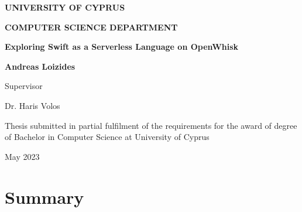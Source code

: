 \documentclass[12pt]{report}
\def\ptitle{Exploring Swift as a Serverless Language on OpenWhisk}
\begin{document}
\begin{titlepage}

\begin{center}
\LARGE{\textbf{\MakeUppercase{University of Cyprus}}}

\Large{\textbf{\MakeUppercase{Computer Science Department}}}

\vspace*{6cm}

\large{\textbf{\ptitle{}}}

\vspace*{0.5cm}

\large{\textbf{Andreas Loizides}}

\vspace*{5cm}

\large{Supervisor}

\large{Dr. Haris Volos}

\vspace*{4cm}

Thesis submitted in partial fulfilment of the requirements for the award of degree of Bachelor in Computer Science at University of Cyprus

\vspace*{1cm}

May 2023
\end{center}

\end{titlepage}



\newpage

\section*{Summary}

\tableofcontents
\listoffigures
\listoftables


%

%

%

%
%


%



\balance



\end{document}
